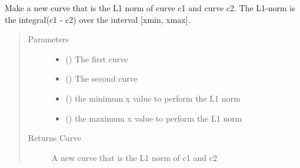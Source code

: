 \documentclass[letterpaper,10pt,english]{sphinxmanual}
\begin{document}
\begin{fulllineitems}
\label{\detokenize{pydv:pydvpy.l1}}
Make a new curve that is the L1 norm of curve c1 and  curve c2.
The L1-norm is the integral(\textbar{}c1 - c2\textbar{}) over the interval {[}xmin, xmax{]}.

\begin{sphinxVerbatim}[commandchars=\\\{\}]
   
\end{sphinxVerbatim}

\begin{sphinxVerbatim}[commandchars=\\\{\}]
     
\end{sphinxVerbatim}
\begin{quote}\begin{description}
\item[{Parameters}] \leavevmode\begin{itemize}
\item {} 
 ({\hyperref[\detokenize{pydv:curve.Curve}]{}}) \textendash{} The first curve

\item {} 
 ({\hyperref[\detokenize{pydv:curve.Curve}]{}}) \textendash{} The second curve

\item {} 
 () \textendash{} the minimum x value to perform the L1 norm

\item {} 
 () \textendash{} the maximum x value to perform the L1 norm

\end{itemize}

\item[{Returns Curve}] \leavevmode
A new curve that is the L1 norm of c1 and c2

\end{description}\end{quote}

\end{fulllineitems}
\end{document}
